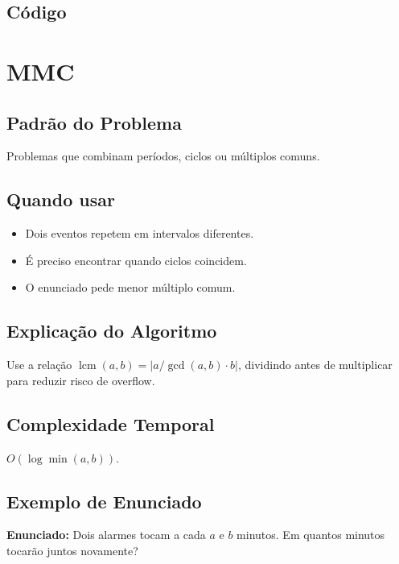\subsection{Código}

\section{MMC}

\subsection{Padrão do Problema}
Problemas que combinam períodos, ciclos ou múltiplos comuns.

\subsection{Quando usar}
\begin{itemize}[nosep]
  \item Dois eventos repetem em intervalos diferentes.
  \item É preciso encontrar quando ciclos coincidem.
  \item O enunciado pede menor múltiplo comum.
\end{itemize}

\subsection{Explicação do Algoritmo}
Use a relação $\operatorname{lcm}(a,b)=|a/\gcd(a,b)\cdot b|$, dividindo antes de multiplicar para reduzir risco de overflow.

\subsection{Complexidade Temporal}
$O(\log \min(a,b))$.

\subsection{Exemplo de Enunciado}
\begin{exemplodiabox}
\textbf{Enunciado:} Dois alarmes tocam a cada $a$ e $b$ minutos. Em quantos minutos tocarão juntos novamente?
\end{exemplodiabox}

